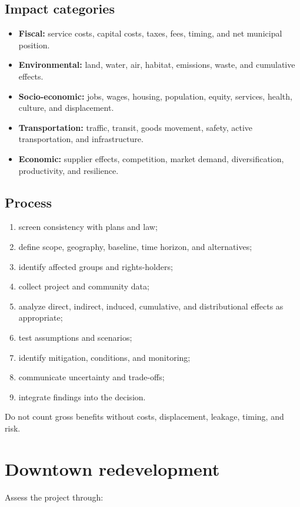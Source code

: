 \documentclass[11pt,letterpaper,oneside,openany]{book}
\begin{document}
\subsection[Impact categories]{Impact categories}
\begin{itemize}
\item \textbf{Fiscal:} service costs, capital costs, taxes, fees, timing, and net municipal position.
\item \textbf{Environmental:} land, water, air, habitat, emissions, waste, and cumulative effects.
\item \textbf{Socio-economic:} jobs, wages, housing, population, equity, services, health, culture, and displacement.
\item \textbf{Transportation:} traffic, transit, goods movement, safety, active transportation, and infrastructure.
\item \textbf{Economic:} supplier effects, competition, market demand, diversification, productivity, and resilience.
\end{itemize}


\subsection[Process]{Process}
\begin{enumerate}
\item screen consistency with plans and law;
\item define scope, geography, baseline, time horizon, and alternatives;
\item identify affected groups and rights-holders;
\item collect project and community data;
\item analyze direct, indirect, induced, cumulative, and distributional effects as appropriate;
\item test assumptions and scenarios;
\item identify mitigation, conditions, and monitoring;
\item communicate uncertainty and trade-offs;
\item integrate findings into the decision.
\end{enumerate}


Do not count gross benefits without costs, displacement, leakage, timing, and risk.


\section[Downtown redevelopment]{Downtown redevelopment}
Assess the project through:
\end{document}
